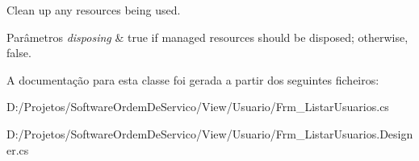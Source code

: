 Clean up any resources being used. 


\begin{DoxyParams}{Parâmetros}
{\em disposing} & true if managed resources should be disposed; otherwise, false.\\
\hline
\end{DoxyParams}


A documentação para esta classe foi gerada a partir dos seguintes ficheiros\+:\begin{DoxyCompactItemize}
\item 
D\+:/\+Projetos/\+Software\+Ordem\+De\+Servico/\+View/\+Usuario/Frm\+\_\+\+Listar\+Usuarios.\+cs\item 
D\+:/\+Projetos/\+Software\+Ordem\+De\+Servico/\+View/\+Usuario/Frm\+\_\+\+Listar\+Usuarios.\+Designer.\+cs\end{DoxyCompactItemize}
